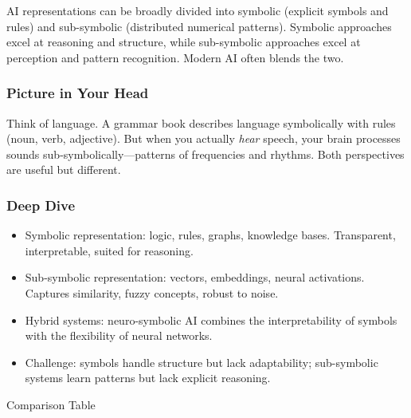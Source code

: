 \documentclass[
  letterpaper,
  DIV=11,
  numbers=noendperiod]{scrreprt}
\providecommand{\tightlist}{%
  \setlength{\itemsep}{0pt}\setlength{\parskip}{0pt}}
\begin{document}
AI representations can be broadly divided into symbolic (explicit
symbols and rules) and sub-symbolic (distributed numerical patterns).
Symbolic approaches excel at reasoning and structure, while sub-symbolic
approaches excel at perception and pattern recognition. Modern AI often
blends the two.

\subsubsection{Picture in Your Head}\label{picture-in-your-head-41}

Think of language. A grammar book describes language symbolically with
rules (noun, verb, adjective). But when you actually \emph{hear} speech,
your brain processes sounds sub-symbolically---patterns of frequencies
and rhythms. Both perspectives are useful but different.

\subsubsection{Deep Dive}\label{deep-dive-41}

\begin{itemize}
\tightlist
\item
  Symbolic representation: logic, rules, graphs, knowledge bases.
  Transparent, interpretable, suited for reasoning.
\item
  Sub-symbolic representation: vectors, embeddings, neural activations.
  Captures similarity, fuzzy concepts, robust to noise.
\item
  Hybrid systems: neuro-symbolic AI combines the interpretability of
  symbols with the flexibility of neural networks.
\item
  Challenge: symbols handle structure but lack adaptability;
  sub-symbolic systems learn patterns but lack explicit reasoning.
\end{itemize}

Comparison Table
\end{document}

